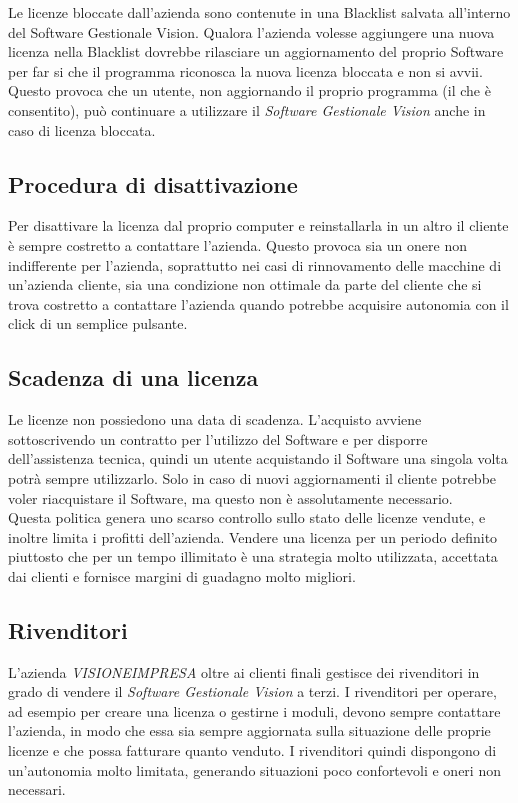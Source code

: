 Le licenze bloccate dall'azienda sono contenute in una Blacklist salvata all’interno del Software Gestionale Vision. Qualora l'azienda volesse aggiungere una nuova licenza nella Blacklist dovrebbe rilasciare un aggiornamento del proprio Software per far si che il programma riconosca la nuova licenza bloccata e non si avvii.
\\Questo provoca che un utente, non aggiornando il proprio programma (il che è consentito), può continuare a utilizzare il \textit{Software Gestionale Vision} anche in caso di licenza bloccata. 

\subsection{Procedura di disattivazione} 
Per disattivare la licenza dal proprio computer e reinstallarla in un altro il cliente è sempre costretto a contattare l'azienda. Questo provoca sia un onere non indifferente per l'azienda, soprattutto nei casi di rinnovamento delle macchine di un'azienda cliente, sia una condizione non ottimale da parte del cliente che si trova costretto a contattare l'azienda quando potrebbe acquisire autonomia con il click di un semplice pulsante.

\subsection{Scadenza di una licenza} 
Le licenze non possiedono una data di scadenza. L'acquisto avviene sottoscrivendo un contratto per l'utilizzo del Software e per disporre dell'assistenza tecnica, quindi un utente acquistando il Software una singola volta potrà sempre utilizzarlo. Solo in caso di nuovi aggiornamenti il cliente potrebbe voler riacquistare il Software, ma questo non è assolutamente necessario. 
\\Questa politica genera uno scarso controllo sullo stato delle licenze vendute, e inoltre limita i profitti dell'azienda. Vendere una licenza per un periodo definito piuttosto che per un tempo illimitato è una strategia molto utilizzata, accettata dai clienti e fornisce margini di guadagno molto migliori.

\subsection{Rivenditori} 
L'azienda \textit{VISIONEIMPRESA} oltre ai clienti finali gestisce dei rivenditori in grado di vendere il \textit{Software Gestionale Vision} a terzi. 
I rivenditori per operare, ad esempio per creare una licenza o gestirne i moduli, devono sempre contattare l'azienda, in modo che essa sia sempre aggiornata sulla situazione delle proprie licenze e che possa fatturare quanto venduto. I rivenditori quindi dispongono di un'autonomia molto limitata, generando situazioni poco confortevoli e oneri non necessari.

